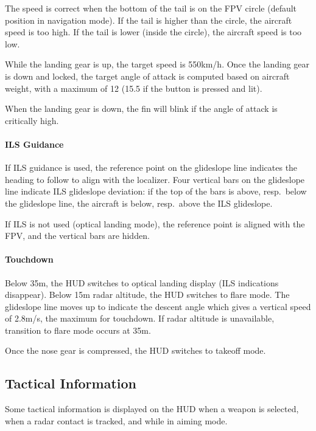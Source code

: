 The speed is correct when the bottom of the tail is on the FPV circle
(default position in navigation mode).
If the tail is higher than the circle, the aircraft speed is too high.
If the tail is lower (inside the circle), the aircraft speed is too low.

While the landing gear is up, the target speed is 550km/h.
Once the landing gear is down and locked, the target angle of attack is
computed based on aircraft weight, with a maximum of 12\textdegree{}
(15.5\textdegree{} if the button  is pressed and lit).

When the landing gear is down, the fin will blink if the angle of attack is critically high.

\paragraph{ILS Guidance}
If ILS guidance is used, the reference point on the glideslope line
indicates the heading to follow to align with the localizer.
Four vertical bars on the glideslope line indicate ILS glideslope deviation:
if the top of the bars is above, resp.\ below the glideslope line,
the aircraft is below, resp.\ above the ILS glideslope.

If ILS is not used (optical landing mode),
the reference point is aligned with the FPV, and the vertical bars are hidden.

\paragraph{Touchdown}
Below 35m, the HUD switches to optical landing display (ILS indications disappear).
Below 15m radar altitude, the HUD switches to flare mode.
The glideslope line moves up to indicate the descent angle
which gives a vertical speed of 2.8m/s, the maximum for touchdown.
If radar altitude is unavailable, transition to flare mode occurs at 35m.

Once the nose gear is compressed, the HUD switches to takeoff mode.

\subsection{Tactical Information}
Some tactical information is displayed on the HUD when a weapon is selected,
when a radar contact is tracked, and while in aiming mode.
